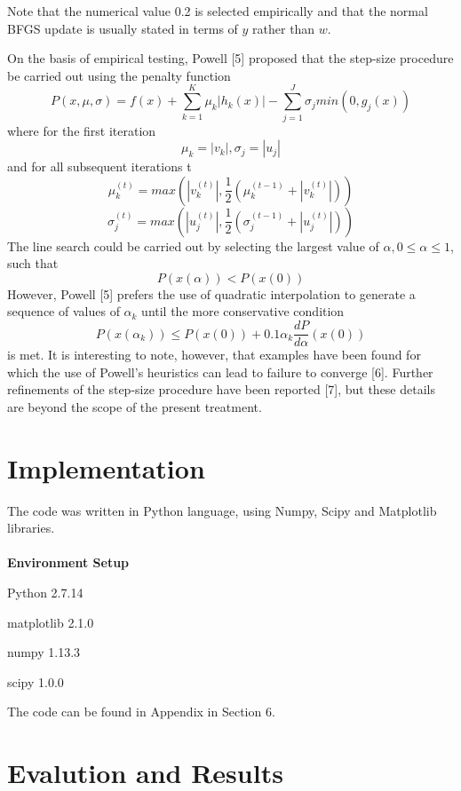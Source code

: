 \documentclass{article}
\begin{document}
Note that the numerical value 0.2 is selected empirically and that the normal BFGS update is usually stated in terms of $y$ rather than $w$.\par
On the basis of empirical testing, Powell [5] proposed that the step-size procedure be carried out using the penalty function
\[P(x, \mu, \sigma) = f(x) + \sum_{k=1}^{K} \mu_k|h_k(x)| - \sum_{j=1}^{J} \sigma_j min(0,g_j(x))\]
where for the first iteration
\[\mu_k = |v_k|, \sigma_j = |u_j|\]
and for all subsequent iterations t
\[\mu_k^{(t)} = max(|v_k^{(t)}|,\frac{1}{2}(\mu_k^{(t-1)} + |v_k^{(t)}|))\]
\[\sigma_j^{(t)} = max(|u_j^{(t)}|,\frac{1}{2}(\sigma_j^{(t-1)} + |u_j^{(t)}|))\]
The line search could be carried out by selecting the largest value of $\alpha , 0 \leq \alpha \leq1$, such that
\[P(x(\alpha)) < P(x(0))\]
However, Powell [5] prefers the use of quadratic interpolation to generate a sequence of values of $\alpha_k$ until the more conservative condition
\[P(x(\alpha_k)) \leq P(x(0)) + 0.1\alpha_k\frac{dP}{d\alpha}(x(0))\]
is met. It is interesting to note, however, that examples have been found for which the use of Powell’s heuristics can lead to failure to converge [6]. Further refinements of the step-size procedure have been reported [7], but these details are beyond the scope of the present treatment.\par


\section{Implementation}

The code was written in Python language, using Numpy, Scipy and Matplotlib libraries.\\ \\
\textbf{Environment Setup}

\begin{list}{•}{ }
\item Python 2.7.14
\item matplotlib 2.1.0
\item numpy 1.13.3
\item scipy 1.0.0
\end{list}

The code can be found in Appendix in Section 6.

\section{Evalution and Results}
\end{document}
